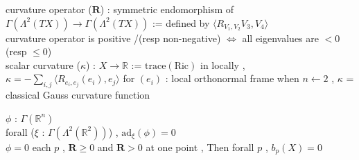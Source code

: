 \begin{Definition}
\itemdefi
  \Define curvature operator (\(\mathbf{R}\)) : symmetric endomorphism of \(\Gamma(\Lambda^2(TX)) \to \Gamma(\Lambda^2(TX))\) := defined by \(\langle R_{V_1 , V_2} V_3 , V_4 \rangle\) \\
  \Define curvature operator is positive /(resp non-negative) \(\iff\) all eigenvalues are \(< 0\) (resp \(\leq 0\)) \\
  \Define scalar curvature (\(\kappa\)) : \(X \to \mathbb{R}\) := \(\text{trace}(\text{Ric})\)
\itemprop
  in locally , \(\kappa = -\sum_{i,j} \langle R_{e_i , e_j}(e_i) , e_j \rangle\) for \((e_i)\) : local orthonormal frame
\itemprop
  when \(n \leftarrow 2\) , \(\kappa\) = classical Gauss curvature function
\end{Definition}

\begin{Theorem}
\itemprop
  \For \(\phi\) : \(\Gamma(\mathbb{R}^n)\) \\
  \IfHold forall (\(\xi\) : \(\Gamma(\Lambda^2(\mathbb{R}^2))\)) , \(\text{ad}_{\xi}(\phi) = 0\) \\
  \Then \(\phi = 0\)
\itemprop
  \For each \(p\) ,
\itemprop
  \IfHold \(\mathbf{R} \geq 0\) and \(\mathbf{R} > 0\) at one point , Then forall \(p\) , \(b_p(X) = 0\)
\end{Theorem}

